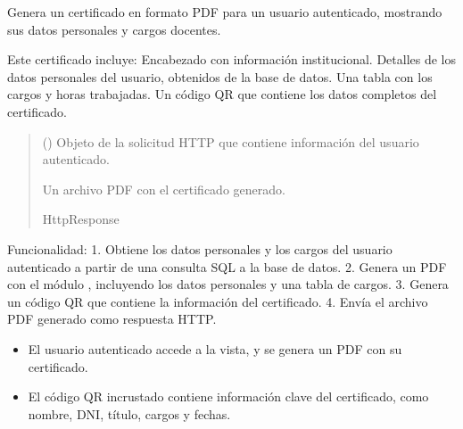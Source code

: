 \documentclass[letterpaper,10pt,spanish]{sphinxmanual}
\begin{document}
\begin{fulllineitems}

\pysigstartsignatures
{}
\pysigstopsignatures
\sphinxAtStartPar
Genera un certificado en formato PDF para un usuario autenticado, mostrando sus datos personales y cargos docentes.

\sphinxAtStartPar
Este certificado incluye:
\sphinxhyphen{} Encabezado con información institucional.
\sphinxhyphen{} Detalles de los datos personales del usuario, obtenidos de la base de datos.
\sphinxhyphen{} Una tabla con los cargos y horas trabajadas.
\sphinxhyphen{} Un código QR que contiene los datos completos del certificado.
\begin{quote}\begin{description}
\sphinxAtStartPar
{} () \textendash{} Objeto de la solicitud HTTP que contiene información del usuario autenticado.

\sphinxAtStartPar
Un archivo PDF con el certificado generado.

\sphinxAtStartPar
HttpResponse

\end{description}\end{quote}

\sphinxAtStartPar
Funcionalidad:
1. Obtiene los datos personales y los cargos del usuario autenticado a partir de una consulta SQL a la base de datos.
2. Genera un PDF con el módulo , incluyendo los datos personales y una tabla de cargos.
3. Genera un código QR que contiene la información del certificado.
4. Envía el archivo PDF generado como respuesta HTTP.
\begin{description}
\begin{itemize}
\item {} 
\sphinxAtStartPar
El usuario autenticado accede a la vista, y se genera un PDF con su certificado.

\item {} 
\sphinxAtStartPar
El código QR incrustado contiene información clave del certificado, como nombre, DNI, título, cargos y fechas.

\end{itemize}


\end{description}
\end{fulllineitems}
\end{document}
